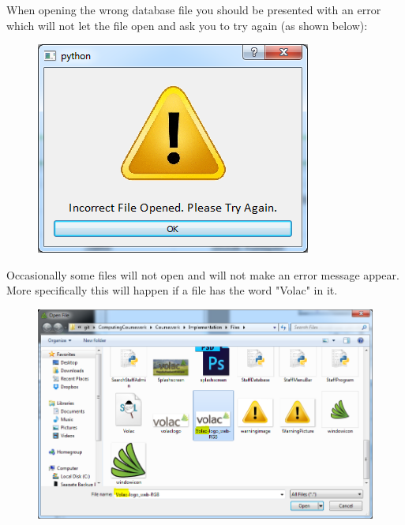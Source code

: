 When opening the wrong database file you should be presented with an error which will not let the file open and ask you to try again (as shown below):

\begin{figure}[H]
    \includegraphics[width=\textwidth]{./Manual/Images/incorrectfile.png}
\end{figure}

Occasionally some files will not open and will not make an error message appear. More specifically this will happen if a file has the word "Volac" in it. 

\begin{figure}[H]
    \includegraphics[width=\textwidth]{./Manual/Images/incorrectfile2.png}
\end{figure}

